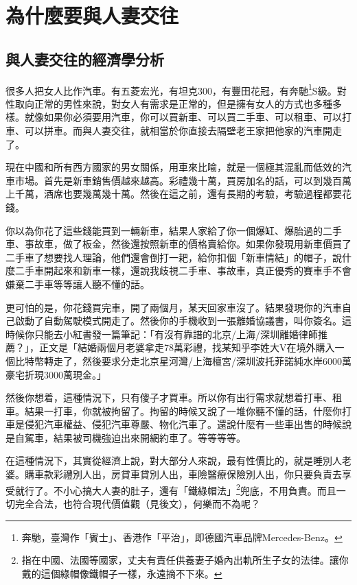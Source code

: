 \chapter{為什麼要與人妻交往}

\section{與人妻交往的經濟學分析}

很多人把女人比作汽車。有五菱宏光，有坦克300，有豐田花冠，有奔馳\footnote{奔馳，臺灣作「賓士」、香港作「平治」，即德國汽車品牌Mercedes-Benz。}S級。對性取向正常的男性來說，對女人有需求是正常的，但是擁有女人的方式也多種多樣。就像如果你必須要用汽車，你可以買新車、可以買二手車、可以租車、可以打車、可以拼車。而與人妻交往，就相當於你直接去隔壁老王家把他家的汽車開走了。

現在中國和所有西方國家的男女關係，用車來比喻，就是一個極其混亂而低效的汽車市場。首先是新車銷售價越來越高。彩禮幾十萬，買房加名的話，可以到幾百萬上千萬，酒席也要幾萬幾十萬。然後在這之前，還有長期的考驗，考驗過程都要花錢。

你以為你花了這些錢能買到一輛新車，結果人家給了你一個爆缸、爆胎過的二手車、事故車，做了板金，然後還按照新車的價格賣給你。如果你發現用新車價買了二手車了想要找人理論，他們還會倒打一耙，給你扣個「新車情結」的帽子，說什麼二手車開起來和新車一樣，還說我歧視二手車、事故車，真正優秀的賽車手不會嫌棄二手車等等讓人聽不懂的話。

更可怕的是，你花錢買完車，開了兩個月，某天回家車沒了。結果發現你的汽車自己啟動了自動駕駛模式開走了。然後你的手機收到一張離婚協議書，叫你簽名。這時候你只能去小紅書發一篇筆記：「有沒有靠譜的北京/上海/深圳離婚律師推薦？」，正文是「結婚兩個月老婆拿走78萬彩禮，找某知乎李姓大V在境外購入一個比特幣轉走了，然後要求分走北京星河灣/上海檀宮/深圳波托菲諾純水岸6000萬豪宅折現3000萬現金。」

然後你想着，這種情況下，只有傻子才買車。所以你有出行需求就想着打車、租車。結果一打車，你就被拘留了。拘留的時候又說了一堆你聽不懂的話，什麼你打車是侵犯汽車權益、侵犯汽車尊嚴、物化汽車了。還說什麼有一些車出售的時候說是自駕車，結果被司機強迫出來開網約車了。等等等等。

在這種情況下，其實從經濟上說，對大部分人來說，最有性價比的，就是睡別人老婆。購車款彩禮別人出，房貸車貸別人出，車險醫療保險別人出，你只要負責去享受就行了。不小心搞大人妻的肚子，還有「鐵綠帽法」\footnote{指在中國、法國等國家，丈夫有責任供養妻子婚內出軌所生子女的法律。讓你戴的這個綠帽像鐵帽子一樣，永遠摘不下來。}兜底，不用負責。而且一切完全合法，也符合現代價值觀（見後文），何樂而不為呢？


